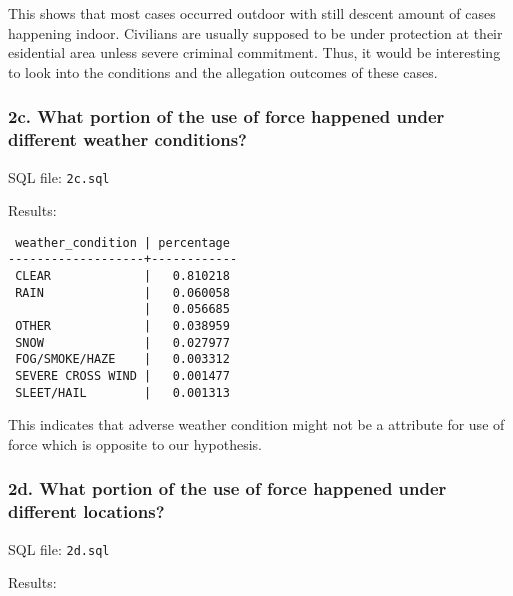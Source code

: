 \documentclass[10pt]{article}
\begin{document}
This shows that most cases occurred outdoor with still descent amount of cases happening indoor. Civilians are usually supposed to be under protection at their esidential area unless severe criminal commitment. Thus, it would be interesting to look into the conditions and the allegation outcomes of these cases.

\subsubsection*{2c. What portion of the use of force happened under different weather conditions?}

SQL file: \texttt{2c.sql}

Results:

\begin{verbatim}
 weather_condition | percentage
-------------------+------------
 CLEAR             |   0.810218
 RAIN              |   0.060058
                   |   0.056685
 OTHER             |   0.038959
 SNOW              |   0.027977
 FOG/SMOKE/HAZE    |   0.003312
 SEVERE CROSS WIND |   0.001477
 SLEET/HAIL        |   0.001313
\end{verbatim}

This indicates that adverse weather condition might not be a attribute for use of force which is opposite to our hypothesis.

\subsubsection*{2d. What portion of the use of force happened under different locations?}

SQL file: \texttt{2d.sql}

Results:
\end{document}
